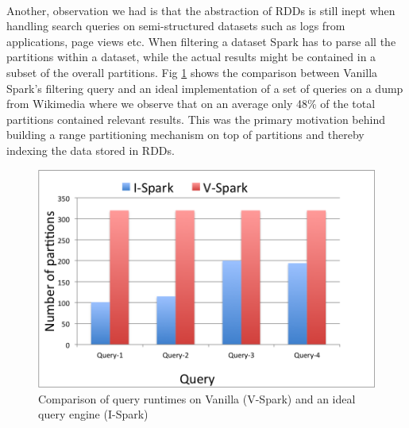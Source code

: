 \paragraph{}
	Another, observation we had is that the abstraction of RDDs is still inept when handling search queries on semi-structured datasets such as logs from applications, page views etc. When filtering a dataset Spark has to parse all the partitions within a dataset, while the actual results might be contained in a subset of the overall partitions. Fig \ref{fig:fig2} shows the comparison between Vanilla Spark's filtering query and an ideal implementation of a set of queries on a dump from Wikimedia \cite{wikimedia} where we observe that on an average only 48\% of the total partitions contained relevant results. This was the primary motivation behind building a range partitioning mechanism on top of partitions and thereby indexing the data stored in RDDs.

\begin{figure}[!ht]
\caption{Comparison of query runtimes on Vanilla (V-Spark) and an ideal query engine (I-Spark)}
\label{fig:fig2}
\includegraphics[scale=0.50]{./images/image2.png}
\end{figure}

